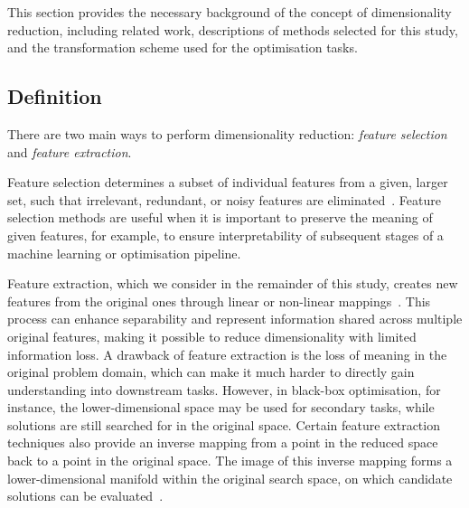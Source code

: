 This section provides the necessary background of the concept of dimensionality reduction, including related work, descriptions of methods selected for this study, and the transformation scheme used for the optimisation tasks.

\subsection{Definition}

There are two main ways to perform dimensionality reduction: \emph{feature selection} and \emph{feature extraction}.

Feature selection determines a subset of individual features from a given, larger set, such that irrelevant, redundant, or noisy features are eliminated~\citep{TheBho24}.
Feature selection methods are useful when it is important to preserve the meaning of given features, for example, to ensure interpretability of subsequent stages of a machine learning or optimisation pipeline.

Feature extraction, which we consider in the remainder of this study, creates new features from the original ones through linear or non-linear mappings~\citep{ElhEtAl24}. This process can enhance separability and represent information shared across multiple original features, making it possible to reduce dimensionality with limited information loss.
A drawback of feature extraction is the loss of
meaning in the original problem domain,
which can make it much harder to directly gain understanding into downstream tasks.
However, in black-box optimisation, for instance, the lower-dimensional space may be used for secondary tasks, while solutions are still searched for in the original space.
Certain feature extraction techniques also provide an inverse mapping from a point in the reduced space back to a point in the original space. The image of this inverse mapping forms a lower-dimensional manifold within the original search space, on which candidate solutions can be evaluated~\citep{RapEtAl20}.

